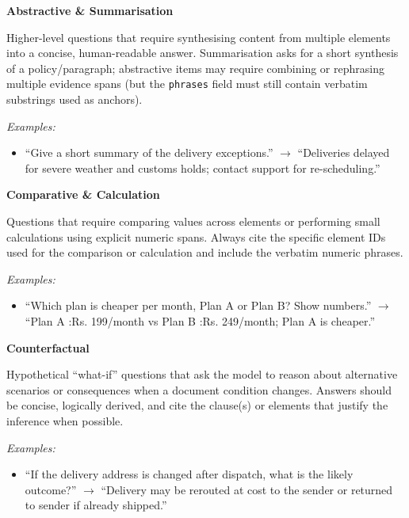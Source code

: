 \begin{tcolorbox}[prompt_reasoning, title=Reasoning QA Taxonomy]

\textbf{Abstractive \& Summarisation}

Higher-level questions that require synthesising content from multiple elements into a concise, human-readable answer.
Summarisation asks for a short synthesis of a policy/paragraph; abstractive items may require combining or rephrasing multiple evidence spans (but the \texttt{phrases} field must still contain verbatim substrings used as anchors).

\medskip
\textit{Examples:}
\begin{itemize}
  \item ``Give a short summary of the delivery exceptions.''
  $\rightarrow$ ``Deliveries delayed for severe weather and customs holds; contact support for re-scheduling.''
\end{itemize}

\vspace{6pt}
\textbf{Comparative \& Calculation}

Questions that require comparing values across elements or performing small calculations using explicit numeric spans. Always cite the specific element IDs used for the comparison or calculation and include the verbatim numeric phrases.

\medskip
\textit{Examples:}
\begin{itemize}
  \item ``Which plan is cheaper per month, Plan A or Plan B? Show numbers.'' 
  $\rightarrow$ ``Plan A :Rs. 199/month vs Plan B :Rs. 249/month; Plan A is cheaper.''
  

\end{itemize}

\vspace{6pt}
\textbf{Counterfactual}

Hypothetical ``what-if'' questions that ask the model to reason about alternative scenarios or consequences when a document condition changes.
Answers should be concise, logically derived, and cite the clause(s) or elements that justify the inference when possible.

\medskip
\textit{Examples:}
\begin{itemize}
  \item ``If the delivery address is changed after dispatch, what is the likely outcome?''
  $\rightarrow$ ``Delivery may be rerouted at cost to the sender or returned to sender if already shipped.''
\end{itemize}

\end{tcolorbox}



